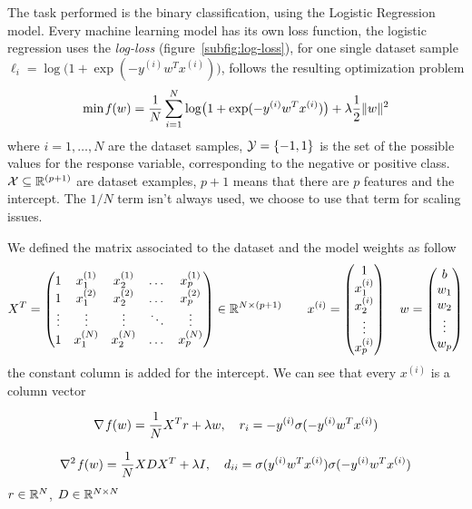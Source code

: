 The task performed is the binary classification, using the Logistic Regression model. Every machine learning model has its own loss function, the logistic regression uses the \emph{log-loss} (figure~\vref{subfig:log-loss}), for one single dataset sample $\ell_i=\log\bigl(1+\exp(-y^{(i)}w^Tx^{(i)})\bigr)$, follows the resulting optimization problem
\begin{equation}\label{eq:opt-prob}
\min\operatorname*{\mathit{f}}(w)=\frac{1}{N}\sum_{i=1}^N\log\bigl(1+\exp(-y^{(i)}w^Tx^{(i)})\bigr)+\lambda\frac{1}{2}\lVert w\rVert^2
\end{equation}
where $i=1,\dots,N$ are the dataset samples, $\mathcal{Y}=\{-1,1\}$ is the set of the possible values for the response variable, corresponding to the negative or positive class. $\mathcal{X}\subseteq\mathbb{R}^{(p+1)}$ are dataset examples, $p+1$ means that there are $p$ features and the intercept. The $1/N$ term isn't always used, we choose to use that term for scaling issues.

We defined the matrix associated to the dataset and the model weights as follow
\[
X^T=
\begin{pmatrix}
1 & x_1^{(1)} & x_2^{(1)} & \dots & x_p^{(1)} \\
1 & x_1^{(2)} & x_2^{(2)} & \dots & x_p^{(2)} \\
\vdots & \vdots & \vdots & \ddots & \vdots \\
1 & x_1^{(N)} & x_2^{(N)} & \dots & x_p^{(N)}
\end{pmatrix}\in\mathbb{R}^{N\times(p+1)}\qquad
x^{(i)}=
\begin{pmatrix}
1 \\ x_1^{(i)} \\ x_2^{(i)} \\ \vdots \\ x_p^{(i)}
\end{pmatrix}\quad
w=
\begin{pmatrix}
b \\ w_1 \\ w_2 \\ \vdots \\ w_p
\end{pmatrix}
\]
the constant column is added for the intercept. We can see that every $x^{(i)}$ is a column vector

\[
\nabla\operatorname*{\mathit{f}}(w)=\frac{1}{N}X^Tr+\lambda w,\quad r_i=-y^{(i)}\sigma(-y^{(i)}w^Tx^{(i)})
\]

\[
\nabla^2\operatorname*{\mathit{f}}(w)=\frac{1}{N}XDX^T+\lambda I,\quad d_{ii}=\sigma(y^{(i)}w^Tx^{(i)})\sigma(-y^{(i)}w^Tx^{(i)})
\]
$r\in\mathbb{R}^N$, $D\in\mathbb{R}^{N\times N}$

